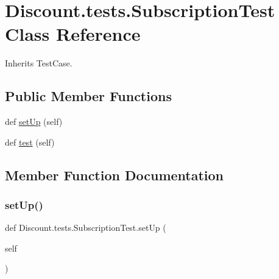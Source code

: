 \hypertarget{class_discount_1_1tests_1_1_subscription_test}{}\section{Discount.\+tests.\+Subscription\+Test Class Reference}
\label{class_discount_1_1tests_1_1_subscription_test}


Inherits Test\+Case.

\subsection*{Public Member Functions}
\begin{DoxyCompactItemize}
\item 
def \hyperlink{class_discount_1_1tests_1_1_subscription_test_ab3624b6a525faff714a739862884db5d}{set\+Up} (self)
\item 
def \hyperlink{class_discount_1_1tests_1_1_subscription_test_a28e37c6e1c38859b57877bfb9db5e71a}{test} (self)
\end{DoxyCompactItemize}


\subsection{Member Function Documentation}
\mbox{\label{class_discount_1_1tests_1_1_subscription_test_ab3624b6a525faff714a739862884db5d}} 
\subsubsection{\texorpdfstring{set\+Up()}{setUp()}}
{\footnotesize\ttfamily def Discount.\+tests.\+Subscription\+Test.\+set\+Up (\begin{DoxyParamCaption}\item[{}]{self }\end{DoxyParamCaption})}

\mbox{\label{class_discount_1_1tests_1_1_subscription_test_a28e37c6e1c38859b57877bfb9db5e71a}} 
